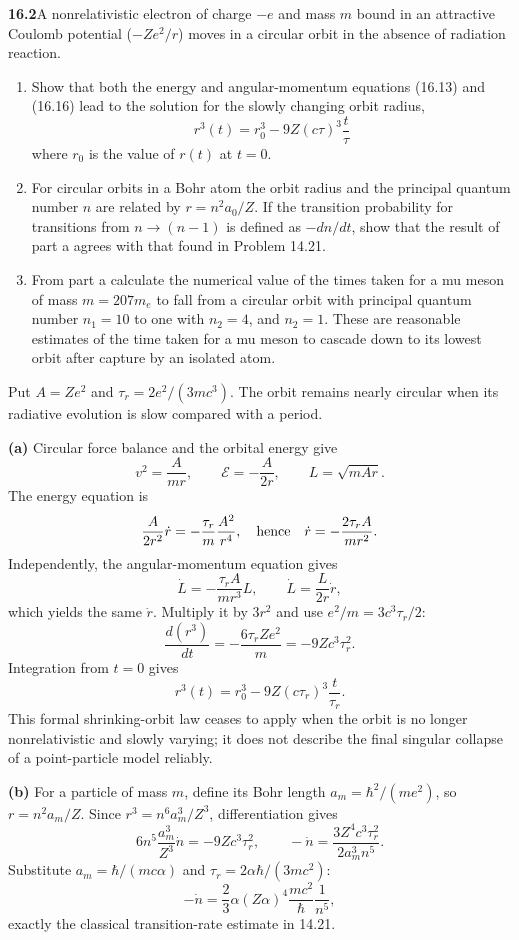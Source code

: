 \par\bigskip
\noindent\textbf{16.2}\quad A nonrelativistic electron of charge $-e$ and mass $m$ bound in an attractive Coulomb potential ($-Ze^{2}/r$) moves in a circular orbit in the absence of radiation reaction.
\begin{enumerate}
\item[(a)] Show that both the energy and angular-momentum equations (16.13) and (16.16) lead to the solution for the slowly changing orbit radius,
\[
r^{3}(t)=r_{0}^{3}-9Z(c\tau)^{3}\frac{t}{\tau}
\]
where $r_{0}$ is the value of $r(t)$ at $t=0$.
\item[(b)] For circular orbits in a Bohr atom the orbit radius and the principal quantum number $n$ are related by $r=n^{2}a_{0}/Z$. If the transition probability for transitions from $n\to(n-1)$ is defined as $-dn/dt$, show that the result of part a agrees with that found in Problem 14.21.
\item[(c)] From part a calculate the numerical value of the times taken for a mu meson of mass $m=207m_{e}$ to fall from a circular orbit with principal quantum number $n_{1}=10$ to one with $n_{2}=4$, and $n_{2}=1$. These are reasonable estimates of the time taken for a mu meson to cascade down to its lowest orbit after capture by an isolated atom.
\end{enumerate}
\solution

Put $A=Ze^2$ and $\tau_r=2e^2/(3mc^3)$. The orbit remains nearly
circular when its radiative evolution is slow compared with a period.

\textbf{(a)} Circular force balance and the orbital energy give
\[
v^2=\frac A{mr},\qquad
\mathcal E=-\frac A{2r},\qquad
L=\sqrt{mAr}.
\]
The energy equation is
\[
\frac A{2r^2}\dot r
=-\frac{\tau_r}{m}\frac{A^2}{r^4},
\quad\hbox{hence}\quad
\dot r=-\frac{2\tau_r A}{mr^2}.
\]
Independently, the angular-momentum equation gives
\[
\dot L=-\frac{\tau_r A}{mr^3}L,
\qquad \dot L=\frac L{2r}\dot r,
\]
which yields the same $\dot r$. Multiply it by $3r^2$ and use
$e^2/m=3c^3\tau_r/2$:
\[
\frac{d(r^3)}{dt}=-\frac{6\tau_r Ze^2}{m}
=-9Zc^3\tau_r^2.
\]
Integration from $t=0$ gives
\[
\boxed{r^3(t)=r_0^3-9Z(c\tau_r)^3\frac t{\tau_r}.}
\]
This formal shrinking-orbit law ceases to apply when the orbit is no
longer nonrelativistic and slowly varying; it does not describe the
final singular collapse of a point-particle model reliably.

\textbf{(b)} For a particle of mass $m$, define its Bohr length
$a_m=\hbar^2/(me^2)$, so $r=n^2a_m/Z$.
Since $r^3=n^6a_m^3/Z^3$, differentiation gives
\[
6n^5\frac{a_m^3}{Z^3}\dot n=-9Zc^3\tau_r^2,
\qquad
-\dot n=\frac{3Z^4c^3\tau_r^2}{2a_m^3n^5}.
\]
Substitute $a_m=\hbar/(mc\alpha)$ and
$\tau_r=2\alpha\hbar/(3mc^2)$:
\[
\boxed{-\dot n=\frac23\alpha(Z\alpha)^4
\frac{mc^2}{\hbar}\frac1{n^5},}
\]
exactly the classical transition-rate estimate in 14.21.

